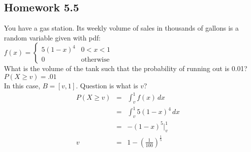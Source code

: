   \subsection*{ Homework 5.5 }
    You have a gas station. Its weekly volume of sales in thousands of gallons
    is a random variable given with pdf:\\
    $f(x) = \begin{cases} 5(1-x)^4 & 0 < x < 1\\ 0 & \text{otherwise} 
    \end{cases}$\\
    What is the volume of the tank such that the probability of running out
    is 0.01?\\
    $P(X \ge v) = .01$\\
    In this case, $B = [v, 1]$. Question is what is $v$?\\
    \begin{eqnarray*}
      P(X \ge v) & = & \int_{v}^{1} f(x)\,dx\\
        & = & \int_v^1 5(1-x)^4\,dx\\
        & = & -(1-x)^5 |_v^1\\
      v & = & 1 - \left(\frac{1}{100}\right)^{\frac{1}{5}}
    \end{eqnarray*}
